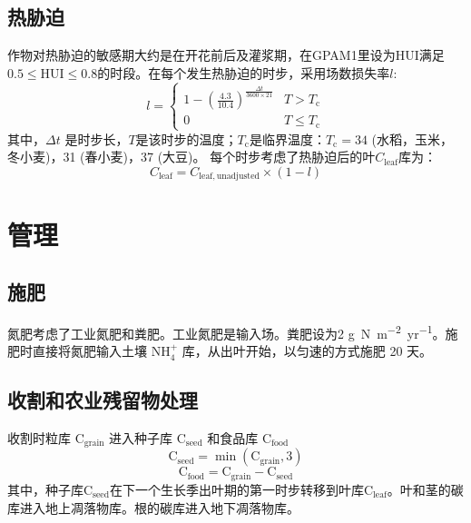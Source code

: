 \subsection{热胁迫}
作物对热胁迫的敏感期大约是在开花前后及灌浆期，在GPAM1里设为${\mathrm {HUI}} $满足$0.5 \leqslant {\mathrm {HUI}} \leqslant 0.8$的时段。在每个发生热胁迫的时步，采用场数损失率$l$:
\begin{equation}
l=\left\{\begin{array}{cc}1-\left(\frac{4.3}{10.4}\right)^{\frac{\Delta t}{3600\times 21}} & T>T_{\mathrm{c}} \\ 0 & T \leqslant T_{\mathrm{c}}\end{array}\right.
\end{equation}
其中，$\Delta t$ 是时步长，$T$是该时步的温度；$T_{\mathrm {c}} $是临界温度：$T_{\mathrm {c}} =34$ \textcelsius (水稻，玉米，冬小麦)，31 \textcelsius (春小麦)，37 \textcelsius (大豆)。
每个时步考虑了热胁迫后的叶$C_{\mathrm{leaf}}$库为：
\begin{equation}
C_{\mathrm{leaf}}=C_{\mathrm{leaf,  {unadjusted}}} \times (1-l)
\end{equation}


\section{管理}
\subsection{施肥}
氮肥考虑了工业氮肥和粪肥。工业氮肥是输入场。粪肥设为2 \unit{g.N.m^{−2}.yr^{−1}}。施肥时直接将氮肥输入土壤 $\mathrm{NH_4^+}$ 库，从出叶开始，以匀速的方式施肥 20 天。

\subsection{收割和农业残留物处理}
收割时粒库 $\mathrm{C_{\mathrm{grain}}}$ 进入种子库 $\mathrm{C_{\mathrm{seed}}}$ 和食品库 $\mathrm{C_{\mathrm{food}}}$
\begin{equation}
\mathrm{{C}_{\mathrm{seed}}}=\min \left(\mathrm{C_{\mathrm{grain}}}, 3\right)
\end{equation}
\begin{equation}
\mathrm{C_{\mathrm{food}}}=\mathrm{C_{\mathrm{grain}}}-\mathrm{C_{\mathrm{seed}}}
\end{equation}
其中，种子库$\mathrm{C_{\mathrm{seed}}}$在下一个生长季出叶期的第一时步转移到叶库$\mathrm{C_{\mathrm{leaf}}}$。叶和茎的碳库进入地上凋落物库。根的碳库进入地下凋落物库。

